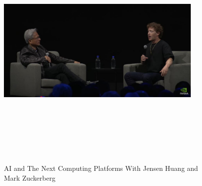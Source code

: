 \documentclass[a4paper,12pt]{article}
\begin{document}
\vspace{50pt} %
\begin{figure}[h]
	\centering
	\vspace{-10pt} %
	\includegraphics[width=0.9\textwidth, height=12cm, keepaspectratio]{../Talks Blogs/AI and The Next Computing Platforms With Jensen Huang and Mark Zuckerberg}
	\vspace{-5pt} %
	\caption{AI and The Next Computing Platforms With Jensen Huang and Mark Zuckerberg}
	\vspace{-10pt}
\end{figure}
\end{document}

